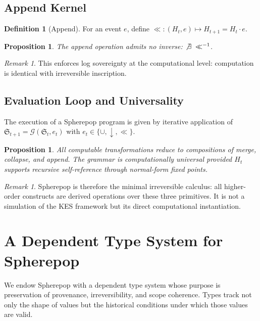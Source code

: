 \documentclass[11pt,a4paper]{article}
\newtheorem{proposition}[theorem]{Proposition}
\theoremstyle{definition}
\newtheorem{definition}[theorem]{Definition}
\theoremstyle{remark}
\newtheorem{remark}[theorem]{Remark}
\begin{document}
\subsection{Append Kernel}

\begin{definition}[Append]
For an event $e$, define $\ll : (H_t, e) \mapsto H_{t+1} = H_t \cdot e$.
\end{definition}

\begin{proposition}
The append operation admits no inverse: $\not\exists\; \ll^{-1}$.
\end{proposition}

\begin{remark}
This enforces log sovereignty at the computational level: computation is identical with irreversible inscription.
\end{remark}

\subsection{Evaluation Loop and Universality}

The execution of a Spherepop program is given by iterative application of $\mathfrak{S}_{t+1} = \mathcal{G}(\mathfrak{S}_t, e_t)$ with $e_t \in \{\cup, \downarrow, \ll\}$.

\begin{proposition}
All computable transformations reduce to compositions of merge, collapse, and append. The grammar is computationally universal provided $H_t$ supports recursive self-reference through normal-form fixed points.
\end{proposition}

\begin{remark}
Spherepop is therefore the minimal irreversible calculus: all higher-order constructs are derived operations over these three primitives. It is not a simulation of the KES framework but its direct computational instantiation.
\end{remark}

\section{A Dependent Type System for Spherepop}

We endow Spherepop with a dependent type system whose purpose is preservation of provenance, irreversibility, and scope coherence. Types track not only the shape of values but the historical conditions under which those values are valid.
\end{document}
